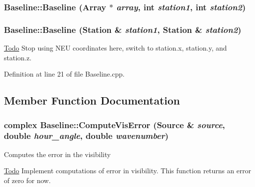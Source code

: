 \hypertarget{classBaseline_a7aa78f64de16ef5469450348407612e9}{
\subsubsection[{Baseline}]{\setlength{\rightskip}{0pt plus 5cm}Baseline::Baseline ({\bf Array} $\ast$ {\em array}, \/  int {\em station1}, \/  int {\em station2})}}
\label{classBaseline_a7aa78f64de16ef5469450348407612e9}
\hypertarget{classBaseline_acb78f3f6c2020cc0c9cc923ddb6a2133}{
\subsubsection[{Baseline}]{\setlength{\rightskip}{0pt plus 5cm}Baseline::Baseline ({\bf Station} \& {\em station1}, \/  {\bf Station} \& {\em station2})}}
\label{classBaseline_acb78f3f6c2020cc0c9cc923ddb6a2133}
\begin{Desc}
\item[\hyperlink{todo__todo000004}{Todo}]Stop using NEU coordinates here, switch to station.x, station.y, and station.z. \end{Desc}


Definition at line 21 of file Baseline.cpp.



\subsection{Member Function Documentation}
\hypertarget{classBaseline_ab5374e1c77d1da0cd8d13dfff39f5877}{
\subsubsection[{ComputeVisError}]{\setlength{\rightskip}{0pt plus 5cm}complex Baseline::ComputeVisError ({\bf Source} \& {\em source}, \/  double {\em hour\_\-angle}, \/  double {\em wavenumber})}}
\label{classBaseline_ab5374e1c77d1da0cd8d13dfff39f5877}
Computes the error in the visibility \begin{Desc}
\item[\hyperlink{todo__todo000006}{Todo}]Implement computations of error in visibility. This function returns an error of zero for now. \end{Desc}


